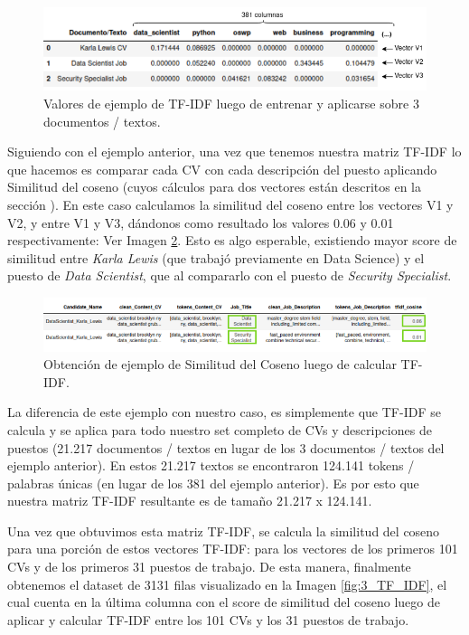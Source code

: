 \documentclass[12pt,a4paper]{article}
\begin{document}
\begin{sloppypar}
\begin{figure}[H] 
 \centering
 \includegraphics[width=1\textwidth]{images/implementacion_5/1_TF_IDF.png}
 \captionsetup{justification=centering,margin=3cm}
 \caption{Valores de ejemplo de TF-IDF luego de entrenar y aplicarse sobre 3 documentos / textos.} 
 \label{fig:1_TF_IDF}
\end{figure}

Siguiendo con el ejemplo anterior, una vez que tenemos nuestra matriz TF-IDF lo que hacemos es comparar cada CV con cada descripción del puesto aplicando Similitud del coseno (cuyos cálculos para dos vectores están descritos en la sección \textit{}). En este caso calculamos la similitud del coseno entre los vectores V1 y V2, y entre V1 y V3, dándonos como resultado los valores 0.06 y 0.01 respectivamente: Ver Imagen \ref{fig:2_TF_IDF}. Esto es algo esperable, existiendo mayor score de similitud entre \textit{Karla Lewis} (que trabajó previamente en Data Science) y el puesto de \textit{Data Scientist}, que al compararlo con el puesto de \textit{Security Specialist}. 

\begin{figure}[H] 
 \centering
 \includegraphics[width=1\textwidth]{images/implementacion_5/2_TF_IDF.png}
 \captionsetup{justification=centering,margin=3cm}
 \caption{Obtención de ejemplo de Similitud del Coseno luego de calcular TF-IDF.} 
 \label{fig:2_TF_IDF}
\end{figure}

La diferencia de este ejemplo con nuestro caso, es simplemente que TF-IDF se calcula y se aplica para todo nuestro set completo de CVs y descripciones de puestos (21.217 documentos / textos en lugar de los 3 documentos / textos del ejemplo anterior). En estos 21.217 textos se encontraron 124.141 tokens / palabras únicas (en lugar de los 381 del ejemplo anterior). Es por esto que nuestra matriz TF-IDF resultante es de tamaño 21.217 x 124.141.

Una vez que obtuvimos esta matriz TF-IDF, se calcula la similitud del coseno para una porción de estos vectores TF-IDF: para los vectores de los primeros 101 CVs y de los primeros 31 puestos de trabajo. De esta manera, finalmente obtenemos el dataset de 3131 filas visualizado en la Imagen \ref{fig:3_TF_IDF}, el cual cuenta en la última columna con el score de similitud del coseno luego de aplicar y calcular TF-IDF entre los 101 CVs y los 31 puestos de trabajo.


\end{sloppypar}
\end{document}
